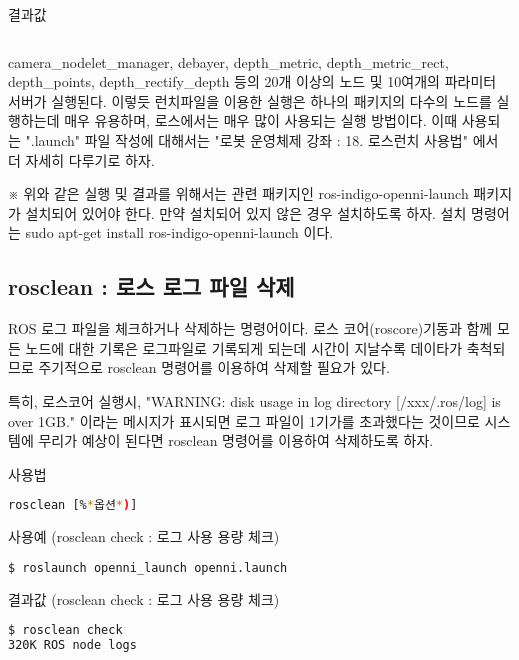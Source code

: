 \noindent
{}\circled{\thenum} 결과값
\begin{lstlisting}[language=bash]
%*생략*)
\end{lstlisting}

camera\_nodelet\_manager,  debayer,  depth\_metric,   depth\_metric\_rect, depth\_points, depth\_rectify\_depth 등의 20개 이상의 노드 및  10여개의 파라미터 서버가 실행된다. 이렇듯 런치파일을 이용한 실행은 하나의 패키지의 다수의 노드를 실행하는데 매우 유용하며, 로스에서는 매우 많이 사용되는 실행 방법이다. 이때 사용되는 ".launch" 파일 작성에 대해서는 "로봇 운영체제 강좌 : 18. 로스런치 사용법" 에서 더 자세히 다루기로 하자.

※ 위와 같은 실행 및 결과를 위해서는 관련 패키지인 ros-indigo-openni-launch 패키지가 설치되어 있어야 한다. 만약 설치되어 있지 않은 경우 설치하도록 하자. 설치 명령어는 sudo apt-get install ros-indigo-openni-launch  이다.

\subsection{rosclean : 로스 로그 파일 삭제}

ROS 로그 파일을 체크하거나 삭제하는 명령어이다. 로스 코어(roscore)기동과 함께 모든 노드에 대한 기록은 로그파일로 기록되게 되는데 시간이 지날수록 데이타가 축척되므로 주기적으로 rosclean 명령어를 이용하여 삭제할 필요가 있다.

특히, 로스코어 실행시, "WARNING: disk usage in log directory [/xxx/.ros/log] is over 1GB." 이라는 메시지가 표시되면 로그 파일이 1기가를 초과했다는 것이므로 시스템에 무리가 예상이 된다면 rosclean 명령어를 이용하여 삭제하도록 하자.

\setcounter{num}{0}

\vspace{\baselineskip}
\noindent
{}\circled{\thenum} 사용법
\begin{lstlisting}[language=bash]
rosclean [%*옵션*)]
\end{lstlisting}

\noindent
{}\circled{\thenum} 사용예 (rosclean check : 로그 사용 용량 체크)
\begin{lstlisting}[language=bash]
$ roslaunch openni_launch openni.launch 
\end{lstlisting}

\noindent
{}\circled{\thenum} 결과값 (rosclean check : 로그 사용 용량 체크)
\begin{lstlisting}[language=bash]
$ rosclean check
320K ROS node logs
\end{lstlisting}

